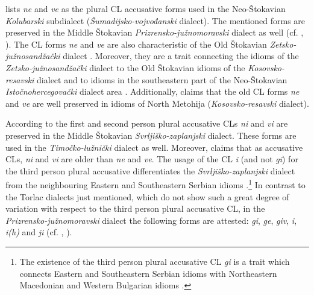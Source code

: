 \largerpage[-2]
\noindent \citet[141]{Okuka08} lists \textit{ne} and \textit{ve} as the plural CL accusative forms used in the Neo-Štokavian \textit{Kolubarski} subdialect (\textit{Šumadijsko-vojvođanski} dialect). The mentioned forms are preserved in the Middle Štokavian \textit{Prizrensko-južnomoravski} dialect as well (cf. \citealt[110]{Stevanovic50}, \citealt[46]{Mladenovic10}). The CL forms \textit{ne} and \textit{ve} are also characteristic of the Old Štokavian \textit{Zetsko-južnosandžački} dialect \citep[cf.][88]{Barjaktarevic66}. Moreover, they are a trait connecting the idioms of the \textit{Zetsko-južnosandžački} dialect to the Old Štokavian idioms of the \textit{Kosovsko-resavski} dialect and to idioms in the southeastern part of the Neo-Štokavian \textit{Istočnohercegovački} dialect area \citep[cf.][121]{Lisac03}. Additionally, \citet[221]{Bukumiric03} claims that the old CL forms \textit{ne} and \textit{ve} are well preserved in idioms of North Metohija (\textit{Kosovsko-resavski} dialect).

According to \citet[255]{Okuka08} the first and second person plural accusative CLs \textit{ni} and \textit{vi} are preserved in the Middle Štokavian \textit{Svrljiško-zaplanjski} dialect. These forms are used in the \textit{Timočko-lužnički} dialect as well. Moreover, \citet[201]{Ivic57} claims that as accusative CLs, \textit{ni} and \textit{vi} are older than \textit{ne} and \textit{ve}. The usage of the CL \textit{i} (and not \textit{gi}) for the third person plural accusative differentiates the \textit{Svrljiško-zaplanjski} dialect from the neighbouring Eastern and Southeastern Serbian idioms \citep[cf.][255]{Okuka08}.\footnote{The existence of the third person plural accusative CL \textit{gi} is a trait which connects Eastern and Southeastern Serbian idioms with Northeastern Macedonian and Western Bulgarian idioms \citep[cf.][20]{Okuka08}.} In contrast to the Torlac dialects just mentioned, which do not show such a great degree of variation with respect to the third person plural accusative CL, in the \textit{Prizrensko-južnomoravski} dialect the following forms are attested: \textit{gi}, \textit{ge}, \textit{giv}, \textit{i}, \textit{i(h)} and \textit{ji} (cf. \citealt[237]{Okuka08}, \citealt[52]{Mladenovic10}).


